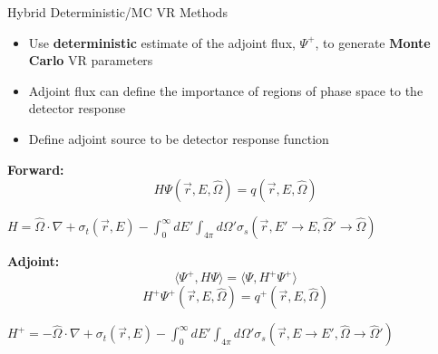 \documentclass{beamer}
\begin{document}
\begin{frame}{Hybrid Deterministic/MC VR Methods}
\begin{itemize}
\item{Use \textbf{deterministic} estimate of the adjoint flux, $\Psi^+$, to
		generate \textbf{Monte Carlo} VR parameters} %
\item{Adjoint flux can define the importance of regions of phase space to the detector response}
\item{Define adjoint source to be detector response function}
\end{itemize}
\vspace{0.5cm}
\textbf{Forward:}
\begin{equation} \label{eq:3.1a}
	 H\Psi(\overrightarrow{r}, E,\widehat{\Omega})  = q(\overrightarrow{r}, E,\widehat{\Omega})
\end{equation}
	\begin{center}
		$H = \widehat{\Omega} \cdot \nabla +
		    \sigma_{t}(\overrightarrow{r},E) - 
			\int_{0}^{\infty} dE'
			\int_{4\pi} d\Omega'
			\sigma_{s}( \overrightarrow{r}, E' 
			\rightarrow E, \widehat{\Omega}' 
			\rightarrow \widehat{\Omega} )$
	\end{center}
	\vspace{0.5cm}
\textbf{Adjoint:}
\begin{equation} \label{eq:3.2b}
		\langle \Psi^{+} , H\Psi \rangle =
		\langle \Psi, H^+\Psi^{+} \rangle
\end{equation}
       \begin{equation}
	 H^+ \Psi^+(\overrightarrow{r}, E,\widehat{\Omega})  = q^+(\overrightarrow{r}, E,\widehat{\Omega})
       \end{equation} 
	\begin{center}
	$H^{+} = -\widehat{\Omega} \cdot \nabla +
	    \sigma_{t}(\overrightarrow{r},E) - 
		\int_{0}^{\infty} dE'
		\int_{4\pi} d\Omega'
		\sigma_{s}( \overrightarrow{r}, E 
		\rightarrow E', \widehat{\Omega} 
		\rightarrow \widehat{\Omega}' )$
       \end{center}


\end{frame}
\end{document}
